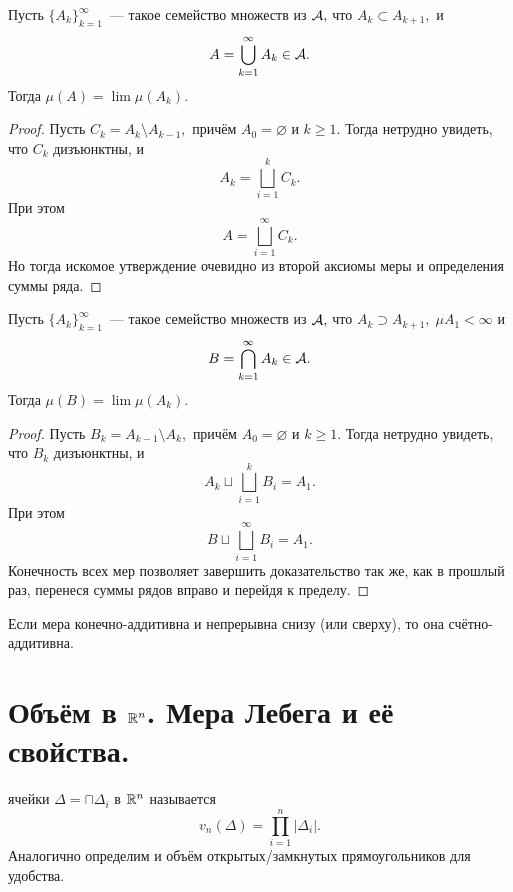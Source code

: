 \documentclass{notes}
\begin{document}
	\begin{pr}
		Пусть $\{A_k\}_{k = 1}^{\infty}$~--- такое семейство множеств из $\mathcal{A},$ что $A_k \subset A_{k + 1},$ и 
		\[
			A = \bigcup\limits_{k = 1}^{\infty} A_k \in \mathcal{A}.
		\]
		Тогда $\mu(A) = \lim \mu(A_k)$.
		\begin{proof}
			Пусть $C_k = A_{k} \setminus A_{k-1},$ причём $A_0 = \varnothing$ и $k \geqslant 1.$ Тогда нетрудно увидеть, что $C_k$ дизъюнктны, и
			\[
				A_k = \bigsqcup_{i = 1}^k C_k.
			\]
			При этом
			\[
				A = \bigsqcup_{i = 1}^{\infty} C_k.
			\]
			Но тогда искомое утверждение очевидно из второй аксиомы меры и определения суммы ряда.
		\end{proof}
	\end{pr}

	\begin{pr}
		Пусть $\{A_k\}_{k = 1}^{\infty}$~--- такое семейство множеств из $\mathcal{A},$ что $A_k \supset A_{k + 1}, \; \mu A_1 < \infty$ и 
		\[
			B = \bigcap\limits_{k = 1}^{\infty} A_k \in \mathcal{A}.
		\]
		Тогда $\mu(B) = \lim \mu(A_k)$.
		\begin{proof}
			Пусть $B_k = A_{k-1} \setminus A_{k},$ причём $A_0 = \varnothing$ и $k \geqslant 1.$ Тогда нетрудно увидеть, что $B_k$ дизъюнктны, и
			\[
				A_k \sqcup \bigsqcup_{i = 1}^k B_i = A_1.
			\]
			При этом
			\[
				B \sqcup \bigsqcup_{i = 1}^{\infty} B_i = A_1.
			\]
			Конечность всех мер позволяет завершить доказательство так же, как в прошлый раз, перенеся суммы рядов вправо и перейдя к пределу.
		\end{proof}
	\end{pr}

	\begin{thm}
		Если мера конечно-аддитивна и непрерывна снизу (или сверху), то она счётно-аддитивна.
	\end{thm} 

\section{Объём в \texorpdfstring{$\mathbb{R}^n$}{𝐑n}. Мера Лебега и её свойства.}

	\begin{de}
		 ячейки $\Delta = \sqcap \Delta_i$ в $\mathbb{R}^n$ называется
		\[
			v_n(\Delta) = \prod\limits_{i = 1}^n |\Delta_i|.
		\]
		Аналогично определим и объём открытых/замкнутых прямоугольников для удобства.
	\end{de}
\end{document}
